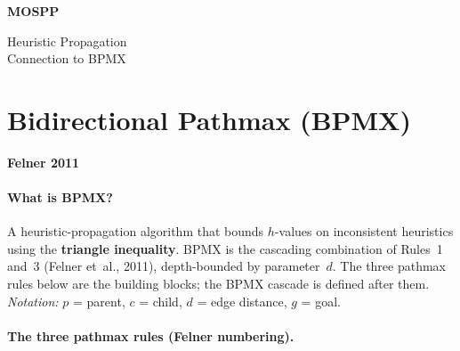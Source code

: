 \documentclass[11pt, a4paper]{article}
\newcommand{\tagfelner}{%
    {\footnotesize\colorbox{felnerbg}{%
    \textcolor{felner}{\textsf{\textbf{Felner 2011}}}}}%
}
\begin{document}

\begin{center}
    {\LARGE\bfseries\color{accentblue}
    MOSPP}

    \vspace{8pt}
    {\large Heuristic Propagation\\[2pt]
    Connection to BPMX}

\end{center}

\vspace{16pt}

\section{Bidirectional Pathmax (BPMX)}
\hfill\tagfelner

\paragraph{What is BPMX?}

A heuristic-propagation algorithm that bounds $h$-values
on inconsistent heuristics using the
\textbf{triangle inequality}. BPMX is the cascading
combination of Rules~1 and~3 (Felner et~al., 2011),
depth-bounded by parameter~$d$. The three pathmax rules
below are the building blocks; the BPMX cascade is
defined after them.\\[2pt]
\textit{Notation:}\;\; $p$ = parent,\;\; $c$ = child,\;\;
$d$ = edge distance,\;\; $g$ = goal.

\paragraph{The three pathmax rules
(Felner numbering).}
\end{document}
